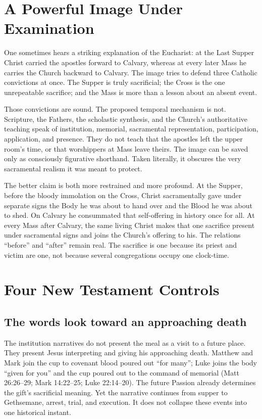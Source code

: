 \begin{deepstudy}

\section{A Powerful Image Under Examination}

One sometimes hears a striking explanation of the Eucharist: at the Last
Supper Christ carried the apostles forward to Calvary, whereas at every later
Mass he carries the Church backward to Calvary. The image tries to defend
three Catholic convictions at once. The Supper is truly sacrificial; the Cross
is the one unrepeatable sacrifice; and the Mass is more than a lesson about an
absent event.

Those convictions are sound. The proposed temporal mechanism is not. Scripture,
the Fathers, the scholastic synthesis, and the Church's authoritative teaching
speak of institution, memorial, sacramental representation, participation,
application, and presence. They do not teach that the apostles left the upper
room's time, or that worshippers at Mass leave theirs. The image can be saved
only as consciously figurative shorthand. Taken literally, it obscures the
very sacramental realism it was meant to protect.

The better claim is both more restrained and more profound. At the Supper,
before the bloody immolation on the Cross, Christ sacramentally gave under
separate signs the Body he was about to hand over and the Blood he was about
to shed. On Calvary he consummated that self-offering in history once for all.
At every Mass after Calvary, the same living Christ makes that one sacrifice
present under sacramental signs and joins the Church's offering to his. The
relations ``before'' and ``after'' remain real. The sacrifice is one because
its priest and victim are one, not because several congregations occupy one
clock-time.

\section{Four New Testament Controls}

\subsection*{The words look toward an approaching death}

The institution narratives do not present the meal as a visit to a future
place. They present Jesus interpreting and giving his approaching death.
Matthew and Mark join the cup to covenant blood poured out ``for many''; Luke
joins the body ``given for you'' and the cup poured out to the command of
memorial (Matt 26:26--29; Mark 14:22--25; Luke 22:14--20). The future Passion
already determines the gift's sacrificial meaning. Yet the narrative continues
from supper to Gethsemane, arrest, trial, and execution. It does not collapse
these events into one historical instant.


\end{deepstudy}
